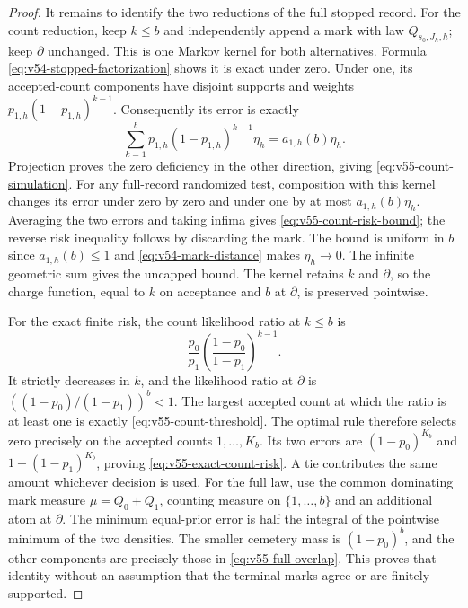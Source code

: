 \begin{proof}
It remains to identify the two reductions of the full stopped record.
For the count reduction, keep $k\le b$ and independently append a mark
with law $Q_{s_0,J_h,h}$; keep $\partial$ unchanged.  This is one
Markov kernel for both alternatives.  Formula
\eqref{eq:v54-stopped-factorization} shows it is exact under zero.
Under one, its accepted-count components have disjoint supports and
weights $p_{1,h}(1-p_{1,h})^{k-1}$.  Consequently its error is exactly
\[
 \sum_{k=1}^{b}p_{1,h}(1-p_{1,h})^{k-1}\eta_h
                         =a_{1,h}(b)\eta_h.
\]
Projection proves the zero deficiency in the other direction, giving
\eqref{eq:v55-count-simulation}.  For any full-record randomized test,
composition with this kernel changes its error under zero by zero and
under one by at most $a_{1,h}(b)\eta_h$.  Averaging the two errors and
taking infima gives \eqref{eq:v55-count-risk-bound}; the reverse risk
inequality follows by discarding the mark.  The bound is uniform in
$b$ since $a_{1,h}(b)\le1$ and \eqref{eq:v54-mark-distance} makes
$\eta_h\to0$.  The infinite geometric sum gives the uncapped bound.
The kernel retains $k$ and $\partial$, so the charge function, equal
to $k$ on acceptance and $b$ at $\partial$, is preserved pointwise.

For the exact finite risk, the count likelihood ratio at $k\le b$ is
\[
 \frac{p_0}{p_1}\left(\frac{1-p_0}{1-p_1}\right)^{k-1}.
\]
It strictly decreases in $k$, and the likelihood ratio at $\partial$
is $((1-p_0)/(1-p_1))^b<1$.  The largest accepted count at which the
ratio is at least one is exactly \eqref{eq:v55-count-threshold}.
The optimal rule therefore selects zero precisely on the accepted
counts $1,\ldots,K_b$.  Its two errors are $(1-p_0)^{K_b}$ and
$1-(1-p_1)^{K_b}$, proving \eqref{eq:v55-exact-count-risk}.
A tie contributes the same amount whichever decision is used.  For the
full law, use the common dominating mark measure $\mu=Q_0+Q_1$,
counting measure on $\{1,\ldots,b\}$ and an additional atom at
$\partial$.  The minimum equal-prior error is half the integral of
the pointwise minimum of the two densities.  The smaller cemetery
mass is $(1-p_0)^b$, and the other components are precisely those in
\eqref{eq:v55-full-overlap}.  This proves that identity without an
assumption that the terminal marks agree or are finitely supported.


\end{proof}
